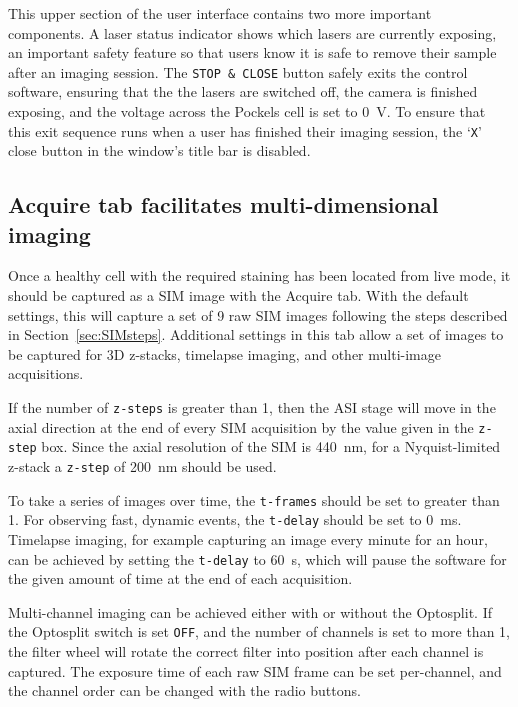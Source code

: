 
This upper section of the user interface contains two more important components. 
A laser status indicator shows which lasers are currently exposing, an important safety feature so that users know it is safe to remove their sample after an imaging session. 
The \texttt{STOP \& CLOSE} button safely exits the control software, ensuring that the the lasers are switched off, the camera is finished exposing, and the voltage across the Pockels cell is set to \SI{0}{\volt}. 
To ensure that this exit sequence runs when a user has finished their imaging session, the `\texttt{X}' close button in the window's title bar is disabled. 

\subsection{Acquire tab facilitates multi-dimensional imaging}
Once a healthy cell with the required staining has been located from live mode, it should be captured as a SIM image with the Acquire tab. 
With the default settings, this will capture a set of 9 raw SIM images following the steps described in Section~\ref{sec:SIMsteps}.
Additional settings in this tab allow a set of images to be captured for 3D z-stacks, timelapse imaging, and other multi-image acquisitions. 

If the number of \texttt{z-steps} is greater than 1, then the ASI stage will move in the axial direction at the end of every SIM acquisition by the value given in the \texttt{z-step} box. 
Since the axial resolution of the SIM is \SI{440}{\nano\meter}, for a Nyquist-limited z-stack a \texttt{z-step} of \SI{200}{\nano\meter} should be used. 

To take a series of images over time, the \texttt{t-frames} should be set to greater than 1.
For observing fast, dynamic events, the \texttt{t-delay} should be set to \SI{0}{\milli\second}. 
Timelapse imaging, for example capturing an image every minute for an hour, can be achieved by setting the \texttt{t-delay} to \SI{60}{\second}, which will pause the software for the given amount of time at the end of each acquisition. 

Multi-channel imaging can be achieved either with or without the Optosplit. 
If the Optosplit switch is set \texttt{OFF}, and the number of channels is set to more than 1, the filter wheel will rotate the correct filter into position after each channel is captured. 
The exposure time of each raw SIM frame can be set per-channel, and the channel order can be changed with the radio buttons. 

